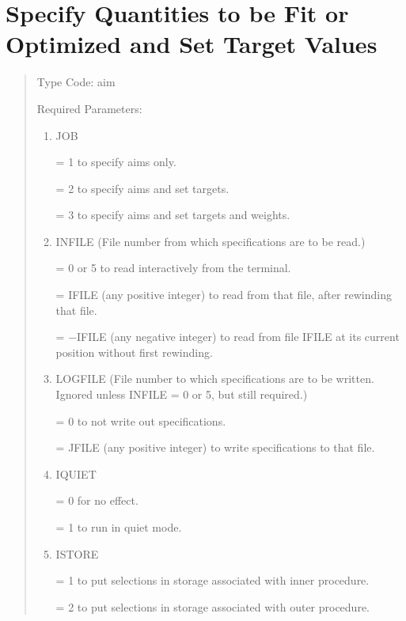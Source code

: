 \section{Specify Quantities to be Fit or Optimized and Set Target Values}    
\begin{quotation}
\noindent    Type Code:  aim
\vspace{5mm}

\noindent     Required Parameters:
\begin{enumerate}
       \item  JOB

              = 1 to specify aims only.

              = 2 to specify aims and set targets.

              = 3 to specify aims and set targets and weights.

       \item  INFILE (File number from which specifications are to be
              read.)

              = 0 or 5 to read interactively from the terminal.

              = IFILE (any positive integer) to read from that file,
after rewinding that \hspace*{1em}file.

			  = $-$IFILE (any negative integer) to read from file IFILE at its
			current \hspace*{1em}position without first rewinding.

       \item  LOGFILE (File number to which specifications are to be
	   written.  Ignored unless INFILE = 0 or 5, but still required.)

	          = 0 to not write out specifications.

	          = JFILE (any positive integer) to write specifications to that
			  file.

       \item  IQUIET

 			  = 0 for no effect.

			  = 1 to run in quiet mode.

       \item  ISTORE

              = 1 to put selections in storage associated with inner
              procedure.

              = 2 to put selections in storage associated with outer
              procedure.


\end{enumerate}
\end{quotation}

